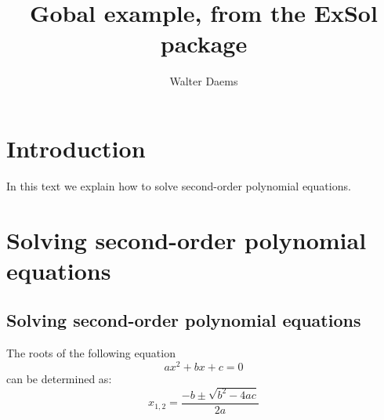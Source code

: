 \documentclass[a4paper,10pt]{article}
\title{Gobal example, from the \textsf{ExSol} package}
\author{Walter Daems}
\begin{document}
\maketitle
\section{Introduction}
In this text we explain how to solve second-order polynomial
equations.
\section{Solving second-order polynomial equations}
\begin{informulacollectiononly}
\section*{Solving second-order polynomial equations}
\end{informulacollectiononly}
\begin{informulacollection}
The roots of the following equation
\begin{equation}
a x^2 + bx + c = 0
\end{equation}
can be determined as:
\begin{equation}
x_{1,2} = \frac{-b \pm \sqrt{b^2 - 4 a c}}{2 a}
\end{equation}
\end{informulacollection}
\end{document}
